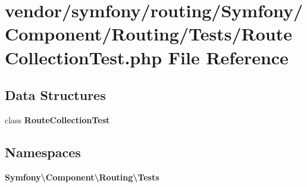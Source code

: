 \section{vendor/symfony/routing/\+Symfony/\+Component/\+Routing/\+Tests/\+Route\+Collection\+Test.php File Reference}
\label{_route_collection_test_8php}
\subsection*{Data Structures}
\begin{DoxyCompactItemize}
\item 
class {\bf Route\+Collection\+Test}
\end{DoxyCompactItemize}
\subsection*{Namespaces}
\begin{DoxyCompactItemize}
\item 
 {\bf Symfony\textbackslash{}\+Component\textbackslash{}\+Routing\textbackslash{}\+Tests}
\end{DoxyCompactItemize}

